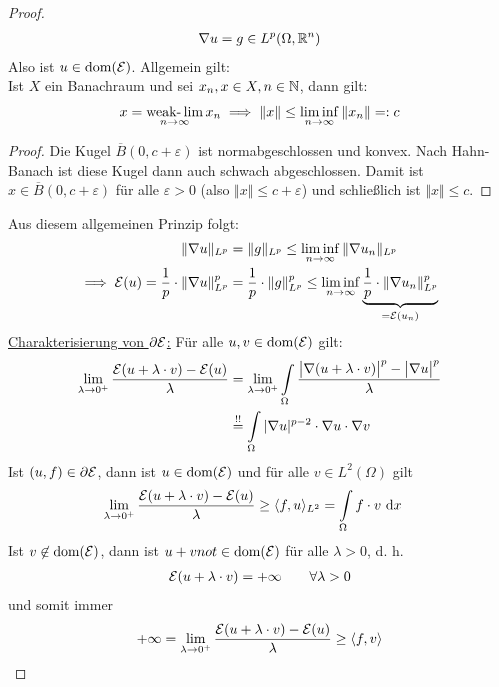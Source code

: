 \begin{beispiel}
\begin{proof}
\begin{align*}
\nabla u=g\in L^p(\Omega,\mathbb{R}^n)
\end{align*}
Also ist $u\in\text{dom}(\mathcal{E})$. Allgemein gilt:\\
Ist $X$ ein Banachraum und sei $x_n,x\in X,n\in\mathbb{N}$, dann gilt:
\begin{align*}
x=\operatorname*{\text{weak-}\lim}\limits_{n\to\infty} x_n\implies\Vert x\Vert\leq\liminf\limits_{n\to\infty}\Vert x_n\Vert=:c
\end{align*}
\begin{proof}
Die Kugel $\overline{B}(0,c+\varepsilon)$ ist normabgeschlossen und konvex. Nach Hahn-Banach ist diese Kugel dann auch schwach abgeschlossen.
Damit ist $x\in\overline{B}(0,c+\varepsilon)$ für alle $\varepsilon>0$ (also $\Vert x\Vert\leq c+\varepsilon$) und schließlich ist $\Vert x\Vert\leq c$.
\end{proof}
Aus diesem allgemeinen Prinzip folgt:
\begin{align*}
\Vert\nabla u\Vert_{L^p}&=\Vert g\Vert_{L^p}\leq\liminf\limits_{n\to\infty}\Vert \nabla u_n\Vert_{L^p}\\
\implies
\mathcal{E}(u)=\frac{1}{p}\cdot\Vert\nabla u\Vert_{L^p}^p&=\frac{1}{p}\cdot\Vert g\Vert_{L^p}^p\leq\liminf\limits_{n\to\infty}\underbrace{\frac{1}{p}\cdot\Vert \nabla u_n\Vert_{L^p}^p}_{=\mathcal{E}(u_n)}
\end{align*}
\underline{Charakterisierung von $\partial\mathcal{E}$:} 
Für alle $u,v\in\text{dom}(\mathcal{E})$ gilt:
\begin{align*}
\lim\limits_{\lambda\to 0^+}\frac{\mathcal{E}(u+\lambda\cdot v)-\mathcal{E}(u)}{\lambda}&=\lim\limits_{\lambda\to 0^+}\int\limits_\Omega\frac{\big|\nabla(u+\lambda\cdot v)\big|^p-\big|\nabla u\big|^p}{\lambda}\\
&\stackrel{!!}{=}
\int\limits_\Omega|\nabla u|^{p-2}\cdot\nabla u\cdot\nabla v
\end{align*}
Ist $(u,f)\in\partial\mathcal{E}$, dann ist $u\in\text{dom}(\mathcal{E})$ und für alle $v\in L^2(\Omega)$ gilt
\begin{align*}
\lim\limits_{\lambda\to 0^+}\frac{\mathcal{E}(u+\lambda\cdot v)-\mathcal{E}(u)}{\lambda}&\geq\langle f,u\rangle_{L^2}
=\int\limits_\Omega f\cdot v\text{ d} x
\end{align*}
Ist $v\not\in\text{dom}(\mathcal{E})$, dann ist $u+vnot\in\text{dom}(\mathcal{E})$ für alle $\lambda>0$, d. h.
\begin{align*}
\mathcal{E}(u+\lambda\cdot v)=+\infty\qquad\forall\lambda>0
\end{align*}
und somit immer
\begin{align*}
+\infty=\lim\limits_{\lambda\to 0^+}\frac{\mathcal{E}(u+\lambda\cdot v)-\mathcal{E}(u)}{\lambda}\geq\langle f,v\rangle
\end{align*}

\end{proof}
\end{beispiel}
